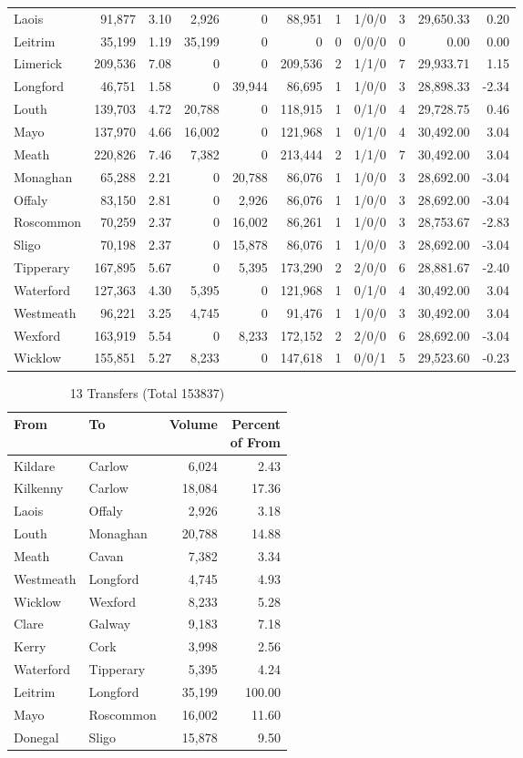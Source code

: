 \documentclass[a4paper]{article}
\begin{document}
\begin{longtable}{lrrrrrrlrrr}
Laois&91,877& 3.10&2,926&0&88,951&1&1/0/0&3&29,650.33& 0.20\\ 
Leitrim&35,199& 1.19&35,199&0&0&0&0/0/0&0& 0.00& 0.00\\ 
Limerick&209,536& 7.08&0&0&209,536&2&1/1/0&7&29,933.71& 1.15\\ 
Longford&46,751& 1.58&0&39,944&86,695&1&1/0/0&3&28,898.33&-2.34\\ 
Louth&139,703& 4.72&20,788&0&118,915&1&0/1/0&4&29,728.75& 0.46\\ 
Mayo&137,970& 4.66&16,002&0&121,968&1&0/1/0&4&30,492.00& 3.04\\ 
Meath&220,826& 7.46&7,382&0&213,444&2&1/1/0&7&30,492.00& 3.04\\ 
Monaghan&65,288& 2.21&0&20,788&86,076&1&1/0/0&3&28,692.00&-3.04\\ 
Offaly&83,150& 2.81&0&2,926&86,076&1&1/0/0&3&28,692.00&-3.04\\ 
Roscommon&70,259& 2.37&0&16,002&86,261&1&1/0/0&3&28,753.67&-2.83\\ 
Sligo&70,198& 2.37&0&15,878&86,076&1&1/0/0&3&28,692.00&-3.04\\ 
Tipperary&167,895& 5.67&0&5,395&173,290&2&2/0/0&6&28,881.67&-2.40\\ 
Waterford&127,363& 4.30&5,395&0&121,968&1&0/1/0&4&30,492.00& 3.04\\ 
Westmeath&96,221& 3.25&4,745&0&91,476&1&1/0/0&3&30,492.00& 3.04\\ 
Wexford&163,919& 5.54&0&8,233&172,152&2&2/0/0&6&28,692.00&-3.04\\ 
Wicklow&155,851& 5.27&8,233&0&147,618&1&0/0/1&5&29,523.60&-0.23\\ 
\end{longtable}

\begin{table}[htbp]
\caption{13 Transfers (Total 153837)}
\centering
\begin{tabular}{llrr} \toprule
From &To &Volume &\shortstack{Percent\\of From} \\ \midrule
Kildare&Carlow&6,024& 2.43\\ 
Kilkenny&Carlow&18,084&17.36\\ 
Laois&Offaly&2,926& 3.18\\ 
Louth&Monaghan&20,788&14.88\\ 
Meath&Cavan&7,382& 3.34\\ 
Westmeath&Longford&4,745& 4.93\\ 
Wicklow&Wexford&8,233& 5.28\\ 
Clare&Galway&9,183& 7.18\\ 
Kerry&Cork&3,998& 2.56\\ 
Waterford&Tipperary&5,395& 4.24\\ 
Leitrim&Longford&35,199&100.00\\ 
Mayo&Roscommon&16,002&11.60\\ 
Donegal&Sligo&15,878& 9.50\\ 
\bottomrule
\end{tabular}
\end{table}
\end{document}
